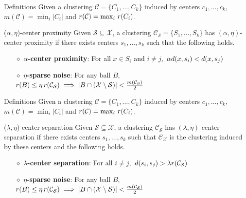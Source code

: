 \documentclass{beamer}
\newcommand{\mc}{\mathcal}
\begin{document}
\begin{frame}{Definitions}
	Given a clustering $\mc C = \{C_1, \ldots, C_k\}$ induced by centers $c_1, \ldots, c_k$, $m(\mc{C}) = \min_i |C_i|$ and $r(\mc{C}) = \max_i \thinspace r(C_i)$.
	
	\vspace{0.1in}\begin{block}{($\alpha, \eta$)-center proximity}
	Given $\mc S \subseteq \mc X$, a clustering $\mc C_{\mc S} = \{S_1, \ldots, S_k\}$ has $(\alpha, \eta)$-center proximity if there exists centers $s_1, \ldots, s_k$  such that the following holds.
	\begin{itemize}
  	\item[$\diamond$] {\bf $\alpha$-center proximity}: For all $x \in S_i$ and $i\neq j$, $\thinspace\alpha d(x, s_i) < d(x, s_j)$
	\item[$\diamond$]{\bf $\eta$-sparse noise}: For any ball $B$, $r(B)\leq \eta \thinspace r(\mc{C}_{\mc S}) \implies |B\cap (\mc X\setminus \mc S)| < \frac{m(\mc C_{\mc S})}{2}$
	\end{itemize}
	\end{block}
\end{frame}

\begin{frame}{Definitions}
	Given a clustering $\mc C = \{C_1, \ldots, C_k\}$ induced by centers $c_1, \ldots, c_k$, $m(\mc{C}) = \min_i |C_i|$ and $r(\mc{C}) = \max_i \thinspace r(C_i)$.

	\vspace{0.1in}\begin{block}{($\lambda, \eta$)-center separation}
	Given $\mc S \subseteq \mc X$, a clustering $\mc C_{\mc S}$ has $(\lambda, \eta)$-center separation if there exists centers $s_1, \ldots, s_k$ such that $\mc C_{\mc X}$ is the clustering induced by these centers and the following holds.

	\begin{itemize}
	\label{defn:lambdacsnoise}	

	\item[$\diamond$] {\bf $\lambda$-center separation}: For all $i\neq j$, $\thinspace d(s_i, s_j) > \lambda r({\mc C}_{\mc S})$
	\item[$\diamond$]{\bf $\eta$-sparse noise}: For any ball $B$, $r(B)\leq \eta \thinspace r(\mc{C}_{\mc S}) \implies |B\cap (\mc X\setminus \mc S)| < \frac{m(\mc C_{\mc S})}{2}$
	\end{itemize}
	\end{block}
\end{frame}
\end{document}
